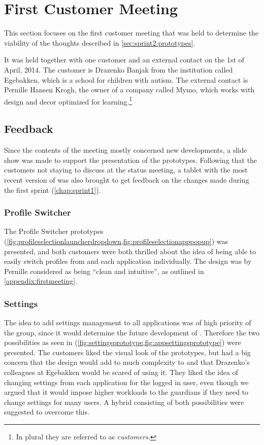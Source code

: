 \section{First Customer Meeting}\label{sec:sprint2:firstmeeting}
This section focuses on the first customer meeting that was held to determine the viability of the thoughts described in \cref{sec:sprint2:prototypes}.

It was held together with one customer and an external contact on the 1st of April, 2014.
The customer is Drazenko Banjak from the institution called Egebakken, which is a school for children with autism.
The external contact is Pernille Hansen Krogh, the owner of a company called Mymo, which works with design and decor optimized for learning.\footnote{In plural they are referred to as \textit{customers}.}


\subsection{Feedback}
Since the contents of the meeting mostly concerned new developments, a slide show was made to support the presentation of the prototypes.
Following that the customers not staying to discuss \giraf at the status meeting, a tablet with the most recent version of \launcher was also brought to get feedback on the changes made during the first sprint (\cref{chap:sprint1}).


\subsubsection{Profile Switcher}
The Profile Switcher prototypes (\cref{fig:profileselectionlauncherdropdown,fig:profileselectionapppopup}) was presented, and both customers were both thrilled about the idea of being able to easily switch profiles from \launcher and each \giraf application individually.
The design was by Pernille considered as being ``clean and intuitive'', as outlined in \cref{appendix:firstmeeting}.


\subsubsection{Settings}
The idea to add settings management to all \giraf applications was of high priority of the group, since it would determine the future development of \launcher.
Therefore the two possibilities as seen in (\cref{fig:settingsprototype,fig:appsettingsprototype}) were presented.
The customers liked the visual look of the prototypes, but had a big concern that the design would add to much complexity to \launcher and that Drazenko's colleagues at Egebakken would be scared of using it.
They liked the idea of changing settings from each application for the logged in user, even though we argued that it would impose higher workloads to the guardians if they need to change settings for many users.
A hybrid consisting of both possibilities were suggested to overcome this.

